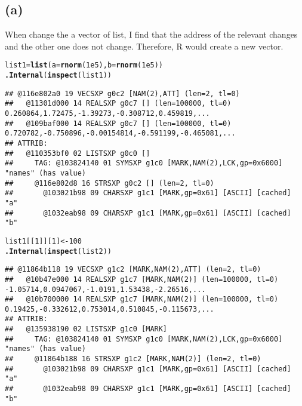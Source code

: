 \documentclass{article}\usepackage[]{graphicx}\usepackage[]{color}
\makeatletter
\newcommand{\hlnum}[1]{\textcolor[rgb]{0.686,0.059,0.569}{#1}}%
\newcommand{\hlstd}[1]{\textcolor[rgb]{0.345,0.345,0.345}{#1}}%
\newcommand{\hlkwb}[1]{\textcolor[rgb]{0.69,0.353,0.396}{#1}}%
\newcommand{\hlkwc}[1]{\textcolor[rgb]{0.333,0.667,0.333}{#1}}%
\newcommand{\hlkwd}[1]{\textcolor[rgb]{0.737,0.353,0.396}{\textbf{#1}}}%
\newenvironment{kframe}{%
 \def\at@end@of@kframe{}%
 \ifinner\ifhmode%
  \def\at@end@of@kframe{\end{minipage}}%
  \begin{minipage}{\columnwidth}%
 \fi\fi%
 \def\FrameCommand##1{\hskip\@totalleftmargin \hskip-\fboxsep
 \colorbox{shadecolor}{##1}\hskip-\fboxsep
     \hskip-\linewidth \hskip-\@totalleftmargin \hskip\columnwidth}%
 \MakeFramed {\advance\hsize-\width
   \@totalleftmargin\z@ \linewidth\hsize
   \@setminipage}}%
 {\par\unskip\endMakeFramed%
 \at@end@of@kframe}
\newenvironment{knitrout}{}{} %
\makeatother
\begin{document}
\subsection{(a)}
When change the a vector of list, I find that the address of the relevant changes and the other one does not change. Therefore, R would create a new vector.
\begin{knitrout}
\color{fgcolor}\begin{kframe}
\begin{alltt}
\hlstd{list1}\hlkwb{=}\hlkwd{list}\hlstd{(}\hlkwc{a}\hlstd{=}\hlkwd{rnorm}\hlstd{(}\hlnum{1e5}\hlstd{),}\hlkwc{b}\hlstd{=}\hlkwd{rnorm}\hlstd{(}\hlnum{1e5}\hlstd{))}
\hlkwd{.Internal}\hlstd{(}\hlkwd{inspect}\hlstd{(list1))}
\end{alltt}
\begin{verbatim}
## @116e802a0 19 VECSXP g0c2 [NAM(2),ATT] (len=2, tl=0)
##   @11301d000 14 REALSXP g0c7 [] (len=100000, tl=0) 0.260864,1.72475,-1.39273,-0.308712,0.459819,...
##   @109baf000 14 REALSXP g0c7 [] (len=100000, tl=0) 0.720782,-0.750896,-0.00154814,-0.591199,-0.465081,...
## ATTRIB:
##   @110353bf0 02 LISTSXP g0c0 [] 
##     TAG: @103824140 01 SYMSXP g1c0 [MARK,NAM(2),LCK,gp=0x6000] "names" (has value)
##     @116e802d8 16 STRSXP g0c2 [] (len=2, tl=0)
##       @103021b98 09 CHARSXP g1c1 [MARK,gp=0x61] [ASCII] [cached] "a"
##       @1032eab98 09 CHARSXP g1c1 [MARK,gp=0x61] [ASCII] [cached] "b"
\end{verbatim}
\begin{alltt}
\hlstd{list1[[}\hlnum{1}\hlstd{]][}\hlnum{1}\hlstd{]}\hlkwb{<-}\hlnum{100}
\hlkwd{.Internal}\hlstd{(}\hlkwd{inspect}\hlstd{(list2))}
\end{alltt}
\begin{verbatim}
## @11864b118 19 VECSXP g1c2 [MARK,NAM(2),ATT] (len=2, tl=0)
##   @10b47e000 14 REALSXP g1c7 [MARK,NAM(2)] (len=100000, tl=0) -1.05714,0.0947067,-1.0191,1.53438,-2.26516,...
##   @10b700000 14 REALSXP g1c7 [MARK,NAM(2)] (len=100000, tl=0) 0.19425,-0.332612,0.753014,0.510845,-0.115673,...
## ATTRIB:
##   @135938190 02 LISTSXP g1c0 [MARK] 
##     TAG: @103824140 01 SYMSXP g1c0 [MARK,NAM(2),LCK,gp=0x6000] "names" (has value)
##     @11864b188 16 STRSXP g1c2 [MARK,NAM(2)] (len=2, tl=0)
##       @103021b98 09 CHARSXP g1c1 [MARK,gp=0x61] [ASCII] [cached] "a"
##       @1032eab98 09 CHARSXP g1c1 [MARK,gp=0x61] [ASCII] [cached] "b"
\end{verbatim}
\end{kframe}
\end{knitrout}
\end{document}
